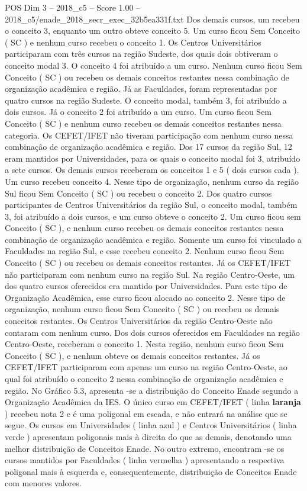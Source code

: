 \begin{textsample}{POS Dim 3 – 2018\_c5 – Score 1.00 – 2018\_c5/enade\_2018\_secr\_exec\_32b5ea331f.txt}
Dos demais cursos, um recebeu o conceito 3, enquanto um outro obteve conceito 5.
Um curso ficou Sem Conceito ( SC ) e nenhum curso recebeu o conceito 1.
Os Centros Universitários participaram com três cursos na região Sudeste, dos quais dois obtiveram o conceito modal 3.
O conceito 4 foi atribuído a um curso.
Nenhum curso ficou Sem Conceito ( SC ) ou recebeu os demais conceitos restantes nessa combinação de organização acadêmica e região.
Já as Faculdades, foram representadas por quatro cursos na região Sudeste.
O conceito modal, também 3, foi atribuído a dois cursos.
Já o conceito 2 foi atribuído a um curso.
Um curso ficou Sem Conceito ( SC ) e nenhum curso recebeu os demais conceitos restantes nessa categoria.
Os CEFET/IFET não tiveram participação com nenhum curso nessa combinação de organização acadêmica e região.
Dos 17 cursos da região Sul, 12 eram mantidos por Universidades, para os quais o conceito modal foi 3, atribuído a sete cursos.
Os demais cursos receberam os conceitos 1 e 5 ( dois cursos cada ).
Um curso recebeu conceito 4.
Nesse tipo de organização, nenhum curso da região Sul ficou Sem Conceito ( SC ) ou recebeu o conceito 2.
Dos quatro cursos participantes de Centros Universitários da região Sul, o conceito modal, também 3, foi atribuído a dois cursos, e um curso obteve o conceito 2.
Um curso ficou sem Conceito ( SC ), e nenhum curso recebeu os demais conceitos restantes nessa combinação de organização acadêmica e região.
Somente um curso foi vinculado a Faculdades na região Sul, e esse recebeu conceito 2.
Nenhum curso ficou Sem Conceito ( SC ) ou recebeu os demais conceitos restantes.
Já os CEFET/IFET não participaram com nenhum curso na região Sul.
Na região Centro-Oeste, um dos quatro cursos oferecidos era mantido por Universidades.
Para este tipo de Organização Acadêmica, esse curso ficou alocado ao conceito 2.
Nesse tipo de organização, nenhum curso ficou Sem Conceito ( SC ) ou recebeu os demais conceitos restantes.
Os Centros Universitários da região Centro-Oeste não contaram com nenhum curso.
Dos dois cursos oferecidos em Faculdades na região Centro-Oeste, receberam o conceito 1.
Nesta região, nenhum curso ficou Sem Conceito ( SC ), e nenhum obteve os demais conceitos restantes.
Já os CEFET/IFET participaram com apenas um curso na região Centro-Oeste, ao qual foi atribuído o conceito 2 nessa combinação de organização acadêmica e região.
No Gráfico 5.3, apresenta -se a distribuição do Conceito Enade segundo a Organização Acadêmica da IES.
O único curso em CEFET/IFET ( linha \textbf{laranja} ) recebeu nota 2 e é uma poligonal em escada, e não entrará na análise que se segue.
Os cursos em Universidades ( linha azul ) e Centros Universitários ( linha verde ) apresentam poligonais mais à direita do que as demais, denotando uma melhor distribuição de Conceitos Enade.
No outro extremo, encontram -se os cursos mantidos por Faculdades ( linha vermelha ) apresentando a respectiva poligonal mais à esquerda e, consequentemente, distribuição de Conceitos Enade com menores valores.

\end{textsample}
